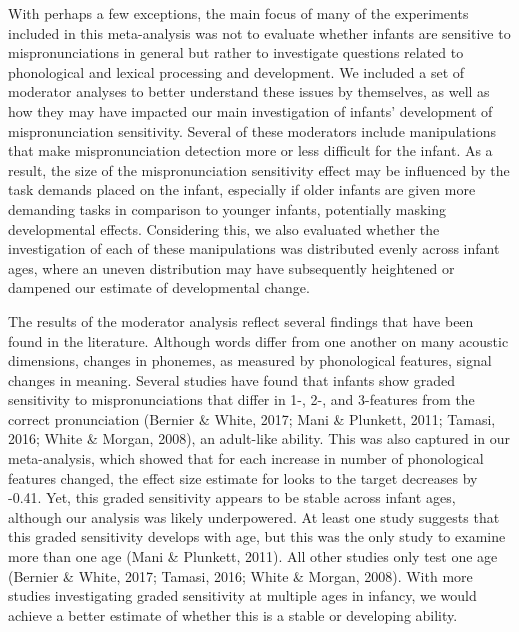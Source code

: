 \documentclass[man]{apa6}
\begin{document}
With perhaps a few exceptions, the main focus of many of the experiments included in this meta-analysis was not to evaluate whether infants are sensitive to mispronunciations in general but rather to investigate questions related to phonological and lexical processing and development. We included a set of moderator analyses to better understand these issues by themselves, as well as how they may have impacted our main investigation of infants' development of mispronunciation sensitivity. Several of these moderators include manipulations that make mispronunciation detection more or less difficult for the infant. As a result, the size of the mispronunciation sensitivity effect may be influenced by the task demands placed on the infant, especially if older infants are given more demanding tasks in comparison to younger infants, potentially masking developmental effects. Considering this, we also evaluated whether the investigation of each of these manipulations was distributed evenly across infant ages, where an uneven distribution may have subsequently heightened or dampened our estimate of developmental change.

The results of the moderator analysis reflect several findings that have been found in the literature. Although words differ from one another on many acoustic dimensions, changes in phonemes, as measured by phonological features, signal changes in meaning. Several studies have found that infants show graded sensitivity to mispronunciations that differ in 1-, 2-, and 3-features from the correct pronunciation (Bernier \& White, 2017; Mani \& Plunkett, 2011; Tamasi, 2016; White \& Morgan, 2008), an adult-like ability. This was also captured in our meta-analysis, which showed that for each increase in number of phonological features changed, the effect size estimate for looks to the target decreases by -0.41. Yet, this graded sensitivity appears to be stable across infant ages, although our analysis was likely underpowered. At least one study suggests that this graded sensitivity develops with age, but this was the only study to examine more than one age (Mani \& Plunkett, 2011). All other studies only test one age (Bernier \& White, 2017; Tamasi, 2016; White \& Morgan, 2008). With more studies investigating graded sensitivity at multiple ages in infancy, we would achieve a better estimate of whether this is a stable or developing ability.
\end{document}
